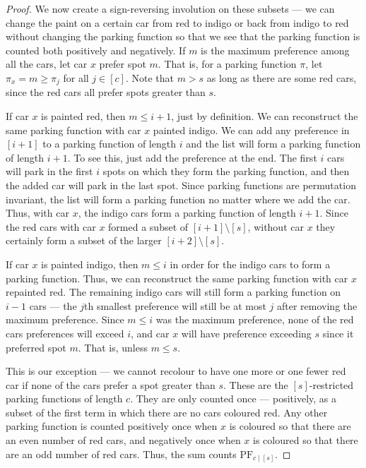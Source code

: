 \documentclass[12 pt]{amsart}
\theoremstyle{definition} %
\theoremstyle{remark} %
\begin{document}
\begin{proof}
	We now create a sign-reversing involution on these subsets --- we can change the paint on a certain car from red to indigo or back from indigo to red without changing the parking function so that we see that the parking function is counted both positively and negatively. If $m$ is the maximum preference among all the cars, let car $x$ prefer spot $m$. That is, for a parking function $\pi$, let $\pi_{x} = m \ge \pi_{j}$ for all $j \in [c]$. Note that $m > s$ as long as there are some red cars, since the red cars all prefer spots greater than $s$.

	If car $x$ is painted red, then  $m \le i + 1$, just by definition. We can reconstruct the same parking function with car $x$ painted indigo. We can add any preference in $[i + 1]$ to a parking function of length $i$ and the list will form a parking function of length $i + 1$. To see this, just add the preference at the end. The first $i$ cars will park in the first $i$ spots on which they form the parking function, and then the added car will park in the last spot. Since parking functions are permutation invariant, the list will form a parking function no matter where we add the car. Thus, with car $x$, the indigo cars form a parking function of length $i + 1$. Since the red cars with car $x$ formed a subset of $[i + 1] \setminus [s]$, without car $x$ they certainly form a subset of the larger $[i + 2] \setminus [s]$.

	If car $x$ is painted indigo, then $m \le i$ in order for the indigo cars to form a parking function. Thus, we can reconstruct the same parking function with car $x$ repainted red. The remaining indigo cars will still form a parking function on $i - 1$ cars --- the $j$th smallest preference will still be at most $j$ after removing the maximum preference. Since $m \le i$ was the maximum preference, none of the red cars preferences will exceed $i$, and car $x$ will have preference exceeding $s$ since it preferred spot $m$. That is, unless $m \le s$.

	This is our exception --- we cannot recolour to have one more or one fewer red car if none of the cars prefer a spot greater than $s$. These are the $[s]$-restricted parking functions of length $c$. They are only counted once --- positively, as a subset of the first term in which there are no cars coloured red. Any other parking function is counted positively once when $x$ is coloured so that there are an even number of red cars, and negatively once when $x$ is coloured so that there are an odd number of red cars. Thus, the sum counts $\mathrm{PF}_{c \mid [s]}$.
\end{proof}
\end{document}
